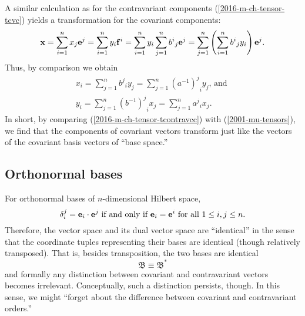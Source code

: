 A similar calculation as for the contravariant components (\ref{2016-m-ch-tensor-tcvc}) yields a transformation for the covariant components:
\begin{equation}
\begin{split}
{\bf x}
=\sum_{i=1}^n x_j {\bf e}^j
=\sum_{i=1}^n { y }_i {\bf f}^i
=\sum_{i=1}^n { y }_i \sum_{j=1}^n {b^i}_j {\bf e}^j
=
\sum_{j=1}^n \left( \sum_{i=1}^n {b^i}_j  { y }_i \right) {\bf e}^j
.
\end{split}
\label{2016-m-ch-tensor-tcontravc}
\end{equation}
Thus, by comparison we obtain
\begin{equation}
\begin{split}
 x_i = \sum_{j=1}^n {b^j}_i  { y }_j =  \sum_{j=1}^n  {\left( a^{-1} \right)^j}_i  { y }_j    \textrm{, and }
\\
 y_i = \sum_{j=1}^n {\left( b^{-1}\right)^j}_i  { x }_j
    = \sum_{j=1}^n {a^j}_i   { x }_j.
\end{split}
\label{2016-m-ch-tensor-tcontravcc}
\end{equation}
In short, by comparing (\ref{2016-m-ch-tensor-tcontravcc})  with (\ref{2001-mu-tensors}), we find that the components of covariant vectors transform just like the vectors of the covariant basis vectors of ``base space.''



\subsection{Orthonormal bases}
For orthonormal bases of $n$-dimensional Hilbert space,
\begin{equation}
\delta_i^j = {\bf e}_i\cdot {\bf e}^j
\textrm { if and only if }
{\bf e}_i= {\bf e}^i  \textrm { for all } 1\le i,j \le n.
\end{equation}
Therefore, the vector space and its dual vector space are ``identical''
in the sense that the coordinate tuples representing their bases are identical
(though relatively transposed).
That is, besides transposition, the two bases are identical
\begin{equation}
{\mathfrak B}\equiv {\mathfrak B}^\ast
\end{equation}
and  formally any distinction between covariant and contravariant vectors becomes
irrelevant. Conceptually, such a distinction persists, though.
In this sense, we might ``forget about the difference between
covariant and contravariant orders.''







